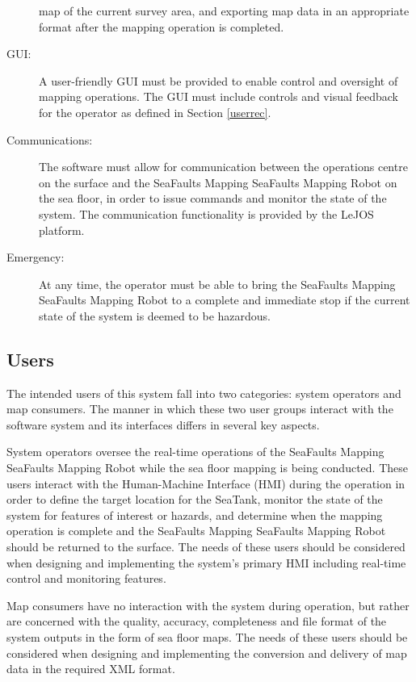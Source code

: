 \documentclass[12pt]{article}
\begin{document}
\begin{description}
map of the current survey area, and exporting map data in an appropriate format after the mapping operation is completed.
\item [{GUI:}] A user-friendly GUI must be provided to enable control and oversight of mapping operations. The GUI must include controls and visual feedback for the operator as defined in Section \ref{userrec}.
\item [{Communications:}] The software must allow for communication between
the operations centre on the surface and the SeaFaults Mapping SeaFaults Mapping Robot on the sea floor,
in order to issue commands and monitor the state of the system. The communication functionality is provided by the LeJOS platform. 
\item [{Emergency:}] At any time, the operator must be able to bring the
SeaFaults Mapping SeaFaults Mapping Robot to a complete and immediate stop if the current state of the
system is deemed to be hazardous.
\end{description}

\subsection{Users}

The intended users of this system fall into two categories: system
operators and map consumers. The manner in which these two user groups
interact with the software system and its interfaces differs in several
key aspects. 

System operators oversee the real-time operations of the SeaFaults Mapping SeaFaults Mapping Robot while
the sea floor mapping is being conducted. These users interact with
the Human-Machine Interface (HMI) during the operation in order to define the target location
for the SeaTank, monitor the state of the system for features of interest
or hazards, and determine when the mapping operation is complete and
the SeaFaults Mapping SeaFaults Mapping Robot should be returned to the surface. The needs of these users
should be considered when designing and implementing the system's
primary HMI including real-time control and monitoring features. 

Map consumers have no interaction with the system during operation,
but rather are concerned with the quality, accuracy, completeness
and file format of the system outputs in the form of sea floor maps.
The needs of these users should be considered when designing and implementing
the conversion and delivery of map data in the required XML format.
\end{document}
